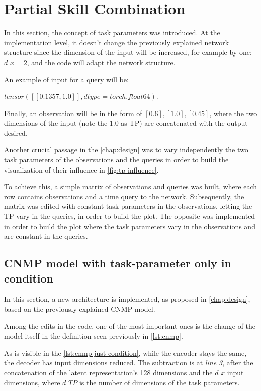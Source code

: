 \section{Partial Skill Combination}
In this section, the concept of task parameters was introduced. At the implementation level, it doesn't change the previously explained network structure since the dimension of the input will be increased, for example by one: $d\_x = 2$, and the code will adapt the network structure.

An example of input for a query will be: 

$tensor([[0.1357, 1.0]], dtype=torch.float64)$. 

Finally, an observation will be in the form of $[0.6],[1.0],[0.45]$, where the two dimensions of the input (note the $1.0$ as TP) are concatenated with the output desired.

Another crucial passage in the \cref{chap:design} was to vary independently the two task parameters of the observations and the queries in order to build the visualization of their influence in \cref{fig:tp-influence}. 

To achieve this, a simple matrix of observations and queries was built, where each row contains observations and a time query to the network. Subsequently, the matrix was edited with constant task parameters in the observations, letting the TP vary in the queries, in order to build the plot. The opposite was implemented in order to build the plot where the task parameters vary in the observations and are constant in the queries. 


\subsection{CNMP model with task-parameter only in condition}
In this section, a new architecture is implemented, as proposed in \cref{chap:design}, based on the previously explained CNMP model. 

Among the edits in the code, one of the most important ones is the change of the model itself in the definition seen previously in \cref{lst:cnmp}. 



As is visible in the \cref{lst:cnmp-just-condition}, while the encoder stays the same, the decoder has input dimensions reduced. The subtraction is at \emph{line 3}, after the concatenation of the latent representation's 128 dimensions and the $d\_x$ input dimensions, where $d\_TP$ is the number of dimensions of the task parameters.

